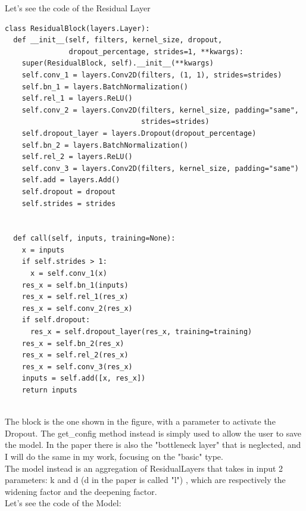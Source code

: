Let's see the code of the Residual Layer
\lstset{language=Python}
\lstset{frame=lines}
\lstset{basicstyle=\footnotesize}
\begin{lstlisting}
class ResidualBlock(layers.Layer):
  def __init__(self, filters, kernel_size, dropout,
               dropout_percentage, strides=1, **kwargs):
    super(ResidualBlock, self).__init__(**kwargs)
    self.conv_1 = layers.Conv2D(filters, (1, 1), strides=strides)
    self.bn_1 = layers.BatchNormalization()
    self.rel_1 = layers.ReLU()
    self.conv_2 = layers.Conv2D(filters, kernel_size, padding="same",
                                strides=strides)
    self.dropout_layer = layers.Dropout(dropout_percentage)
    self.bn_2 = layers.BatchNormalization()
    self.rel_2 = layers.ReLU()
    self.conv_3 = layers.Conv2D(filters, kernel_size, padding="same")
    self.add = layers.Add()
    self.dropout = dropout
    self.strides = strides


  def call(self, inputs, training=None):
    x = inputs
    if self.strides > 1:
      x = self.conv_1(x)
    res_x = self.bn_1(inputs)
    res_x = self.rel_1(res_x)
    res_x = self.conv_2(res_x)
    if self.dropout:
      res_x = self.dropout_layer(res_x, training=training)
    res_x = self.bn_2(res_x)
    res_x = self.rel_2(res_x)
    res_x = self.conv_3(res_x)
    inputs = self.add([x, res_x])
    return inputs
 
\end{lstlisting}
The block is the one shown in the figure, with a parameter to activate the Dropout. The get\_config method instead is simply used to allow the user to save the model.
In the paper there is also the "bottleneck layer" that is neglected, and I will do the same in my work, focusing on the "basic" type.\\
The model instead is an aggregation of ResidualLayers that takes in input 2 parameters: k and d (d in the paper is called "l") , which are respectively the widening factor and the deepening factor.\\
Let's see the code of the Model:
\lstset{language=Python}
\lstset{frame=lines}
\lstset{basicstyle=\footnotesize}
